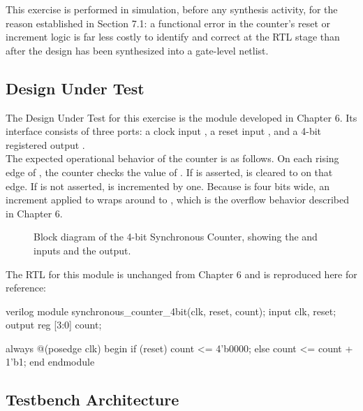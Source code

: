 \noindent This exercise is performed in simulation, before any synthesis activity, for the reason established in Section 7.1: a functional error in the counter's reset or increment logic is far less costly to identify and correct at the RTL stage than after the design has been synthesized into a gate-level netlist.

\subsection{Design Under Test}

The Design Under Test for this exercise is the  module developed in Chapter 6. Its interface consists of three ports: a clock input , a reset input , and a 4-bit registered output .\\


\noindent The expected operational behavior of the counter is as follows. On each rising edge of , the counter checks the value of . If  is asserted,  is cleared to  on that edge. If  is not asserted,  is incremented by one. Because  is four bits wide, an increment applied to  wraps around to , which is the overflow behavior described in Chapter 6.

\begin{figure}[H]
    \centering
	\caption{Block diagram of the 4-bit Synchronous Counter, showing the  and  inputs and the  output.}
    \label{fig:dut}
\end{figure}

\noindent The RTL for this module is unchanged from Chapter 6 and is reproduced here for reference:
\begin{codeblock}{verilog}
module synchronous_counter_4bit(clk, reset, count);
    input clk, reset;
    output reg [3:0] count;

    always @(posedge clk) begin
        if (reset)
            count <= 4'b0000;
        else
            count <= count + 1'b1;
    end
endmodule
\end{codeblock}

\subsection{Testbench Architecture}

